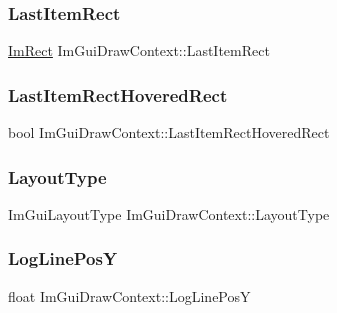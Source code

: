 \subsubsection{\texorpdfstring{Last\+Item\+Rect}{LastItemRect}}
{\footnotesize\ttfamily \hyperlink{struct_im_rect}{Im\+Rect} Im\+Gui\+Draw\+Context\+::\+Last\+Item\+Rect}

\hypertarget{struct_im_gui_draw_context_ad6f4bf282ceef2a07cf25a59008feb16}{}\label{struct_im_gui_draw_context_ad6f4bf282ceef2a07cf25a59008feb16} 
\subsubsection{\texorpdfstring{Last\+Item\+Rect\+Hovered\+Rect}{LastItemRectHoveredRect}}
{\footnotesize\ttfamily bool Im\+Gui\+Draw\+Context\+::\+Last\+Item\+Rect\+Hovered\+Rect}

\hypertarget{struct_im_gui_draw_context_a8516b32e30504c3037d34e93b7988d83}{}\label{struct_im_gui_draw_context_a8516b32e30504c3037d34e93b7988d83} 
\subsubsection{\texorpdfstring{Layout\+Type}{LayoutType}}
{\footnotesize\ttfamily Im\+Gui\+Layout\+Type Im\+Gui\+Draw\+Context\+::\+Layout\+Type}

\hypertarget{struct_im_gui_draw_context_a4060735d06c860014c5359bcf76b1112}{}\label{struct_im_gui_draw_context_a4060735d06c860014c5359bcf76b1112} 
\subsubsection{\texorpdfstring{Log\+Line\+PosY}{LogLinePosY}}
{\footnotesize\ttfamily float Im\+Gui\+Draw\+Context\+::\+Log\+Line\+PosY}

\hypertarget{struct_im_gui_draw_context_a01e52aff3f5efc13fcf6af213cf417c2}{}\label{struct_im_gui_draw_context_a01e52aff3f5efc13fcf6af213cf417c2} 
